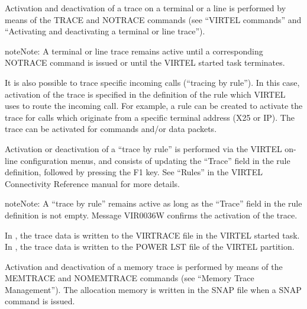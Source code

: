 \documentclass[letterpaper,10pt,english]{sphinxmanual}
\begin{document}
Activation and deactivation of a trace on a terminal or a line is performed by means of the TRACE and NOTRACE commands (see “VIRTEL commands” and “Activating and deactivating a terminal or line trace”).

\begin{sphinxadmonition}{note}{Note:}
A terminal or line trace remains active until a corresponding NOTRACE command is issued or until the VIRTEL started task terminates.
\end{sphinxadmonition}

It is also possible to trace specific incoming calls (“tracing by rule”). In this case, activation of the trace is specified in the definition of the rule which VIRTEL uses to route the incoming call. For example, a rule can be created to activate the trace for calls which originate from a specific terminal address (X25 or IP). The trace can be activated for commands and/or data packets.

Activation or deactivation of a “trace by rule” is performed via the VIRTEL on-line configuration menus, and consists of updating the “Trace” field in the rule definition, followed by pressing the F1 key. See “Rules” in the VIRTEL Connectivity Reference manual for more details.

\begin{sphinxadmonition}{note}{Note:}
A “trace by rule” remains active as long as the “Trace” field in the rule definition is not empty. Message VIR0036W confirms the activation of the trace.
\end{sphinxadmonition}

In , the trace data is written to the VIRTRACE file in the VIRTEL started task.
In , the trace data is written to the POWER LST file of the VIRTEL partition.

Activation and deactivation of a memory trace is performed by means of the MEMTRACE and NOMEMTRACE commands (see “Memory Trace Management”). The allocation memory is written in the SNAP file when a SNAP command is issued.

\end{document}
